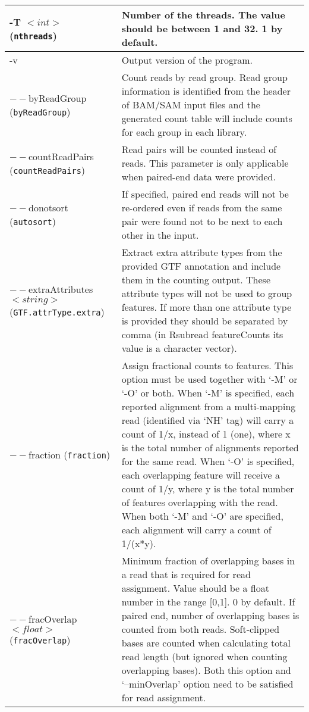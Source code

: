 \documentclass[12pt]{report}
\newcommand{\code}[1]{{\small\texttt{#1}}}
\newcommand{\Rsubread}{\textsf{Rsubread}}
\newcommand{\featureCounts}{\textsf{featureCounts}}
\begin{document}
\begin{longtable}{|p{5cm}|p{11cm}|}
\hline
-T $<int>$ \newline (\code{nthreads}) & Number of the threads. The value should be between 1 and 32. 1 by default.\\
\hline
-v & Output version of the program. \\
\hline
$--$byReadGroup \newline (\code{byReadGroup}) & Count reads by read group. Read group information is identified from the header of BAM/SAM input files and the generated count table will include counts for each group in each library.\\
\hline
$--$countReadPairs \newline (\code{countReadPairs}) & Read pairs will be counted instead of reads. This parameter is only applicable when paired-end data were provided.\\
\hline
$--$donotsort \newline (\code{autosort}) & If specified, paired end reads will not be re-ordered even if reads from the same pair were found not to be next to each other in the input.\\
\hline
$--$extraAttributes $<string>$ \newline (\code{GTF.attrType.extra}) & Extract extra attribute types from the provided GTF annotation and include them in the counting output. These attribute types will not be used to group features. If more than one attribute type is provided they should be separated by comma (in {\Rsubread} {\featureCounts} its value is a character vector).  \\
\hline
$--$fraction \newline (\code{fraction}) & Assign fractional counts to features. This option must be used together with `-M' or `-O' or both. When `-M' is specified, each reported alignment from a multi-mapping read (identified via `NH' tag) will carry a count of 1/x, instead of 1 (one), where x is the total number of alignments reported for the same read. When `-O' is specified, each overlapping feature will receive a count of 1/y, where y is the total number of features overlapping with the read. When both `-M' and `-O' are specified, each alignment will carry a count of 1/(x*y).\\
\hline
$--$fracOverlap $<float>$ \newline (\code{fracOverlap}) & Minimum fraction of overlapping bases in a read that is required for read assignment. Value should be a float number in the range [0,1]. 0 by default. If paired end, number of overlapping bases is counted from both reads. Soft-clipped bases are counted when calculating total read length (but ignored when counting overlapping bases). Both this option and `--minOverlap' option need to be satisfied for read assignment. \\

\end{longtable}
\end{document}
